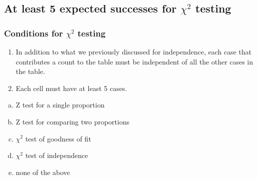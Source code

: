 \documentclass[slidestop,compress,mathserif,12pt,t,professionalfonts,xcolor=table]{beamer}
\newcommand{\solnMult}[1]{#1}
\begin{document}

\subsection{At least 5 expected successes for $\chi^2$ testing}
\label{mi3}


\begin{frame}
\frametitle{Conditions for $\chi^2$ testing}

\begin{enumerate}

\item {} In addition to what we previously discussed for independence, each case that contributes a count to the table must be independent of all the other cases in the table.

\item {} Each cell must have at least 5  cases.

\end{enumerate}

\end{frame}


\begin{frame}


\begin{enumerate}[(a)]
\item Z test for a single proportion
\item Z test for comparing two proportions
\item $\chi^2$ test of goodness of fit
\item $\chi^2$ test of independence
\item \solnMult{none of the above}
\end{enumerate}

\end{frame}
\end{document}

